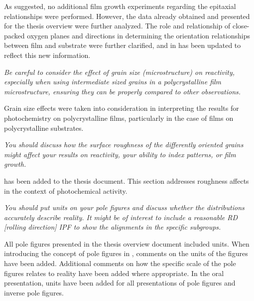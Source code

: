 \documentclass[12pt,%
               letterpaper,
               oneside]{uiothesis}
\begin{document}
\begin{enum}
  As suggested, no additional film growth experiments regarding the epitaxial relationships were performed. However, the data already obtained and presented for the thesis overview were further analyzed. The role and relationship of close-packed oxygen planes and directions in determining the orientation relationships between film and substrate were further clarified, and  in  has been updated to reflect this new information.\vspace{16pt}
  
  \item \emph{Be careful to consider the effect of grain size (microstructure) on reactivity, especially when using intermediate sized grains in a polycrystalline film microstructure, ensuring they can be properly compared to other observations.}\vspace{8pt}
  
  Grain size effects were taken into consideration in interpreting the results for photochemistry on polycrystalline films, particularly in the case of films on polycrystalline substrates. \vspace{16pt}
  
  \item \emph{You should discuss how the surface roughness of the differently oriented grains might affect your results on reactivity, your ability to index patterns, or film growth.} \vspace{8pt}
  
   has been added to the thesis document. This section addresses roughness affects in the context of photochemical activity.\vspace{16pt}
  
  \item \emph{You should put units on  your pole figures and discuss whether the distributions accurately describe reality. It might be of interest to include a reasonable RD [rolling direction] IPF to show the alignments in the specific subgroups.} \vspace{8pt}
  
  All pole figures presented in the thesis overview document included units. When introducing the concept of pole figures in , comments on the units of the figures have been added. Additional comments on how the specific scale of the pole figures relates to reality have been added where appropriate. In the oral presentation, units have been added for all presentations of pole figures and inverse pole figures.\vspace{16pt}
  

\end{enum}
\end{document}
